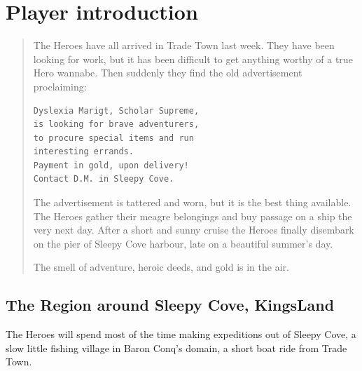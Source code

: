 \documentclass[11pt, twoside, titlepage, a4paper]{report}
\renewcommand{\chaptermark}[1]{\markboth{#1}{}}
\newenvironment{readoutloud}%
{\begin{quote}\begin{itshape}}%
{\end{itshape}\end{quote}}%
\begin{document}


\clearpage
{}
\section*{Player introduction}
\chaptermark{player intro}

\begin{readoutloud}
The Heroes have all arrived in Trade Town last week. They have been looking for work, but it has been difficult to get anything worthy of a true Hero wannabe.
Then suddenly they find the old advertisement proclaiming:

\begin{center}
\begin{verbatim}
Dyslexia Marigt, Scholar Supreme,
is looking for brave adventurers,
to procure special items and run
interesting errands.
Payment in gold, upon delivery!
Contact D.M. in Sleepy Cove.
\end{verbatim}
\end{center}

The advertisement is tattered and worn, but it is the best thing available. The Heroes gather their meagre belongings and buy passage on a ship the very next day. After a short and sunny cruise the Heroes finally disembark on the pier of Sleepy Cove harbour, late on a beautiful summer's day.

The smell of adventure, heroic deeds, and gold is in the air.
\end{readoutloud}



\clearpage
\subsection*{The Region around Sleepy Cove, KingsLand}
The Heroes will spend most of the time making expeditions out of Sleepy Cove, a slow little fishing village in Baron Conq's domain, a short boat ride from Trade Town.
\end{document}
